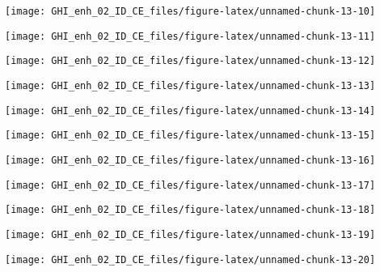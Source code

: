 \documentclass[
  10pt,
  a4paper,oneside]{article}
\begin{document}
\begin{center}\texttt{[image: GHI\_enh\_02\_ID\_CE\_files/figure-latex/unnamed-chunk-13-10]} \end{center}

\begin{center}\texttt{[image: GHI\_enh\_02\_ID\_CE\_files/figure-latex/unnamed-chunk-13-11]} \end{center}

\begin{center}\texttt{[image: GHI\_enh\_02\_ID\_CE\_files/figure-latex/unnamed-chunk-13-12]} \end{center}

\begin{center}\texttt{[image: GHI\_enh\_02\_ID\_CE\_files/figure-latex/unnamed-chunk-13-13]} \end{center}

\begin{center}\texttt{[image: GHI\_enh\_02\_ID\_CE\_files/figure-latex/unnamed-chunk-13-14]} \end{center}

\begin{center}\texttt{[image: GHI\_enh\_02\_ID\_CE\_files/figure-latex/unnamed-chunk-13-15]} \end{center}

\begin{center}\texttt{[image: GHI\_enh\_02\_ID\_CE\_files/figure-latex/unnamed-chunk-13-16]} \end{center}

\begin{center}\texttt{[image: GHI\_enh\_02\_ID\_CE\_files/figure-latex/unnamed-chunk-13-17]} \end{center}

\begin{center}\texttt{[image: GHI\_enh\_02\_ID\_CE\_files/figure-latex/unnamed-chunk-13-18]} \end{center}

\begin{center}\texttt{[image: GHI\_enh\_02\_ID\_CE\_files/figure-latex/unnamed-chunk-13-19]} \end{center}

\begin{center}\texttt{[image: GHI\_enh\_02\_ID\_CE\_files/figure-latex/unnamed-chunk-13-20]} \end{center}
\end{document}
